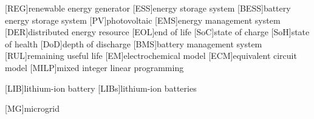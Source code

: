 \begin{acronym}
    [REG]{renewable energy generator}
    [ESS]{energy storage system}
    [BESS]{battery energy storage system}
    [PV]{photovoltaic}
    [EMS]{energy management system}
    [DER]{distributed energy resource}
    [EOL]{end of life}
    [SoC]{state of charge}
    [SoH]{state of health}
    [DoD]{depth of discharge}
    [BMS]{battery management system}
    [RUL]{remaining useful life}
    [EM]{electrochemical model}
    [ECM]{equivalent circuit model}
    [MILP]{mixed integer linear programming}

    [LIB]{lithium-ion battery}
    [LIBs]{lithium-ion batteries}

    [MG]{microgrid}
\end{acronym}